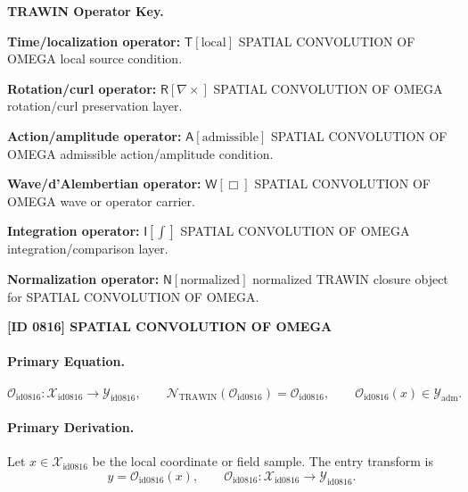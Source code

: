 \par\vspace{0.45\baselineskip}
\noindent\begin{minipage}[t]{\linewidth}
\begingroup
\small
\raggedright
\textbf{TRAWIN Operator Key.}\par
\noindent\textbf{Time/localization operator:} $\mathsf{T}\!\left[\mathrm{local}\right]$ SPATIAL CONVOLUTION OF OMEGA local source condition.\par
\noindent\textbf{Rotation/curl operator:} $\mathsf{R}\!\left[\nabla\times\right]$ SPATIAL CONVOLUTION OF OMEGA rotation/curl preservation layer.\par
\noindent\textbf{Action/amplitude operator:} $\mathsf{A}\!\left[\mathrm{admissible}\right]$ SPATIAL CONVOLUTION OF OMEGA admissible action/amplitude condition.\par
\noindent\textbf{Wave/d'Alembertian operator:} $\mathsf{W}\!\left[\Box\right]$ SPATIAL CONVOLUTION OF OMEGA wave or operator carrier.\par
\noindent\textbf{Integration operator:} $\mathsf{I}\!\left[\int\right]$ SPATIAL CONVOLUTION OF OMEGA integration/comparison layer.\par
\noindent\textbf{Normalization operator:} $\mathsf{N}\!\left[\mathrm{normalized}\right]$ normalized TRAWIN closure object for SPATIAL CONVOLUTION OF OMEGA.\par
\endgroup
\end{minipage}

\clearpage
\noindent\textbf{[ID 0816] SPATIAL CONVOLUTION OF OMEGA}\par
\vspace{0.35em}
\paragraph{Primary Equation.}
\[
\mathcal{O}_{\mathrm{id0816}}:\mathcal{X}_{\mathrm{id0816}}\longrightarrow \mathcal{Y}_{\mathrm{id0816}},\qquad
\mathcal{N}_{\mathrm{TRAWIN}}(\mathcal{O}_{\mathrm{id0816}})=\mathcal{O}_{\mathrm{id0816}},\qquad
\mathcal{O}_{\mathrm{id0816}}(x)\in\mathcal{Y}_{\mathrm{adm}}.
\]

\paragraph{Primary Derivation.} Let $x\in \mathcal{X}_{\mathrm{id0816}}$ be the local coordinate or field sample.  The entry transform is\[
y=\mathcal{O}_{\mathrm{id0816}}(x),\qquad \mathcal{O}_{\mathrm{id0816}}:\mathcal{X}_{\mathrm{id0816}}\longrightarrow \mathcal{Y}_{\mathrm{id0816}}.
\]

